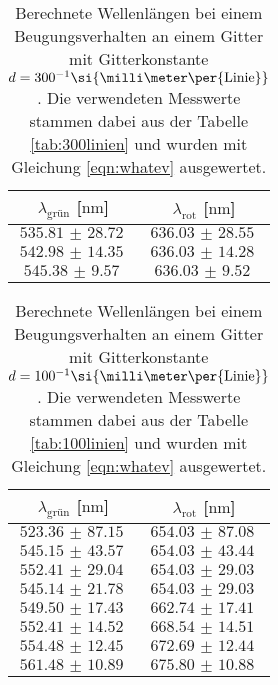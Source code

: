 \begin{table}
    \centering
    \caption{Berechnete Wellenlängen bei einem Beugungsverhalten an einem Gitter mit Gitterkonstante $\protect d = {300^{-1}}\si{\milli\meter\per{\text{Linie}}}$. Die verwendeten Messwerte stammen dabei aus der Tabelle \ref{tab:300linien} und wurden mit Gleichung 
    \ref{eqn:whatev} ausgewertet.}
    \label{tab:wave300}
    \begin{tabular}{c c}
        \toprule
        $\lambda_{\text{grün}}$ [$\si{\nano\meter}$] & $\lambda_{\text{rot}}$ [$\si{\nano\meter}$] \\
        \midrule
        $\SI{535.81(2872)}{}$ & $\SI{636.03(2855)}{}$ \\
        $\SI{542.98(1435)}{}$ & $\SI{636.03(1428)}{}$ \\
        $\SI{545.38(957)}{}$ & $\SI{636.03(952)}{}$  \\
        \bottomrule    
    \end{tabular}
\end{table}
\begin{table}
    \centering
    \caption{Berechnete Wellenlängen bei einem Beugungsverhalten an einem Gitter mit Gitterkonstante $\protect d = {100^{-1}}\si{\milli\meter\per{\text{Linie}}}$. Die verwendeten Messwerte stammen dabei aus der Tabelle \ref{tab:100linien} und wurden mit Gleichung 
    \ref{eqn:whatev} ausgewertet.}
    \label{tab:wave100}
    \begin{tabular}{c c}
        \toprule
        $\lambda_{\text{grün}}$ [$\si{\nano\meter}$] & $\lambda_{\text{rot}}$ [$\si{\nano\meter}$] \\
        \midrule
        $\SI{523.36(8715)}{}$ & $\SI{654.03(8708)}{}$ \\
        $\SI{545.15(4357)}{}$ & $\SI{654.03(4344)}{}$ \\
        $\SI{552.41(2904)}{}$ & $\SI{654.03(2903)}{}$ \\
        $\SI{545.14(2178)}{}$ & $\SI{654.03(2903)}{}$ \\
        $\SI{549.50(1743)}{}$ & $\SI{662.74(1741)}{}$ \\
        $\SI{552.41(1452)}{}$ & $\SI{668.54(1451)}{}$ \\
        $\SI{554.48(1245)}{}$ & $\SI{672.69(1244)}{}$ \\
        $\SI{561.48(1089)}{}$ & $\SI{675.80(1088)}{}$ \\
        \bottomrule    
    \end{tabular}
\end{table}
